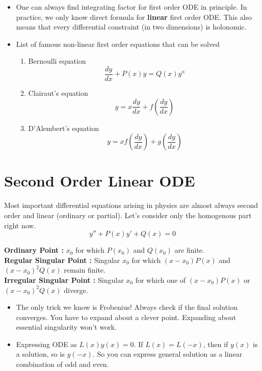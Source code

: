 \documentclass{report}
\begin{document}
\begin{itemize}
  \item One can always find integrating factor for first order ODE in principle. In practice, we only know direct formula for \textbf{linear} first order ODE. This also means that every differential constraint (in two dimensions) is holonomic.

  \item List of famous non-linear first order equations that can be solved

    \begin{enumerate}
      \item Bernoulli equation
        $$\frac{dy}{dx} + P(x)y = Q(x)y^n$$
      \item Clairaut's equation
        $$y = x\frac{dy}{dx} + f\left(\frac{dy}{dx}\right)$$
      \item D'Alembert's equation
        $$y = xf\left(\frac{dy}{dx}\right) + g\left(\frac{dy}{dx}\right)$$
    \end{enumerate}

\end{itemize}

\section{Second Order Linear ODE}
Most important differential equations arising in physics are almost always second order and linear (ordinary or partial). Let's consider only the homogenous part right now.
$$y'' + P(x)y' + Q(x) = 0$$

\noindent \textbf{Ordinary Point :} $x_0$ for which $P(x_0)$ and $Q(x_0)$ are finite.\\

\noindent \textbf{Regular Singular Point :} Singular $x_0$ for which $(x-x_0)P(x)$ and $(x-x_0)^2 Q(x)$ remain finite.\\

\noindent \textbf{Irregular Singular Point :} Singular $x_0$ for which one of $(x-x_0)P(x)$ or $(x-x_0)^2 Q(x)$ diverge.\\

\begin{itemize}
  \item The only trick we know is Frobenius! Always check if the final solution converges. You have to expand about a clever point. Expanding about essential singularity won't work.\\

  \item Expressing ODE as $L(x)y(x) = 0$. If $L(x) = L(-x)$, then if $y(x)$ is a solution, so is $y(-x)$. So you can express general solution as a linear combination of odd and even.
\end{itemize}
\end{document}
